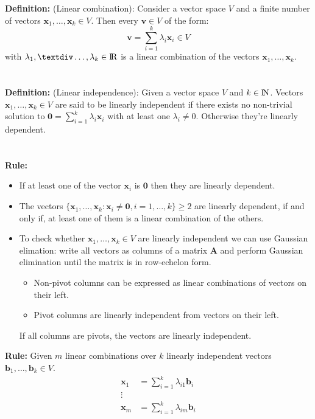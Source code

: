 \documentclass[12pt]{article}
\newcommand{\R}{{\rm I\!R}}
\newcommand{\N}{{\rm I\!N}}
\newcommand{\bx}{{\bm{x}}}
\newcommand{\A}{{\bm{A}}}
\begin{document}
\colorbox{red!30}{\textbf{Definition:}} (Linear combination): Consider a vector space $V$ and a finite number of vectors $\bx_1, \dots, \bx_k \in V$. Then every $\bm{v} \in V$ of the form:
%
	\begin{equation}
		\bm{v} = \sum\limits_{i=1}^{k} \lambda_i \bm{x}_i \in V
	\end{equation}
%
	with $\lambda_1, ÷\dots, \lambda_k \in \R$ is a linear combination of the vectors $\bx_1, \dots, \bx_k$.
%
\\
\\
\\
%
\colorbox{red!30}{\textbf{Definition:}} (Linear independence): Given a vector space $V$ and $k \in \N$. Vectors $\bx_1, \dots, \bx_k \in V$ are said to be linearly independent if there exists no non-trivial solution to $\bm{0} = \sum\nolimits_{i=1}^{k} \lambda_i \bx_i$ with at least one $\lambda_i \neq 0$. Otherwise they're linearly dependent.
%
\\
\\
\\
%
\colorbox{red!30}{\textbf{Rule:}}
%
\begin{itemize}
  \item If at least one of the vector $\bm{x}_i$ is $\bm{0}$ then they are linearly dependent.
  \item The vectors $\{\bx_1, \dots, \bx_k : \bx_i \neq \bm0, i =1, \dots, k\} \geqslant 2$ are linearly dependent, if and only if, at least one of them is a linear combination of the others.
  \item To check whether $\bx_1, \dots, \bx_k \in V$ are linearly independent we can use Gaussian elimation: write all vectors as columns of a matrix $\A$ and perform Gaussian elimination until the matrix is in row-echelon form.\begin{itemize}
  \item Non-pivot columns can be expressed as linear combinations of vectors on their left.
  \item Pivot columns are linearly independent from vectors on their left.
	  \end{itemize}
	  If all columns are pivots, the vectors are linearly independent.
\end{itemize}
%
\colorbox{red!30}{\textbf{Rule:}} Given $m$ linear combinations over $k$ linearly independent vectors $\bm{b}_1, \dots, \bm{b}_k \in V$.
%
\begin{equation}
	\begin{aligned}
		\bx_1 &= \sum\limits_{i=1}^k \lambda_{i1} \bm{b}_i \\
		\vdots & \\
		\bx_m &= \sum\limits_{i=1}^k \lambda_{im} \bm{b}_i \\
	\end{aligned}
\end{equation}
\end{document}
